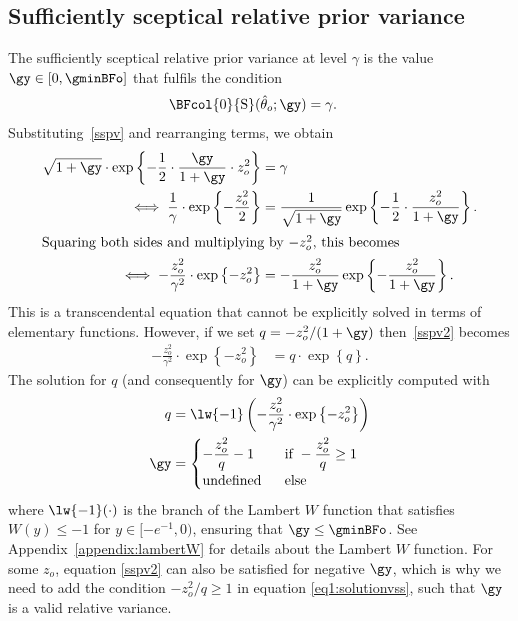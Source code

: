 \begin{subappendices}
  \renewcommand{\thesection}{\Alph{section}}

\section{Sufficiently sceptical relative prior variance}
\label{appendix:ssrv}
The sufficiently sceptical relative prior variance at level $\gamma$ is the
value $\gy \in [0, \gminBFo]$ that fulfils the condition
\begin{align}
  \label{sspv}
  \BFcol{0}{\text{S}}(\hat{\theta}_o; \gy)
  &= \gamma.
\end{align}
Substituting~\eqref{sspv} and rearranging terms, we obtain
\begin{align}
  \label{sspv2}
  \sqrt{1 + \gy} \cdot
  \exp\left\{-\frac{1}{2} \cdot
  \frac{\gy}{1 + \gy} \cdot z^2_o\right\}
  &= \gamma \nonumber \\
  \iff \frac{1}{\gamma} \cdot \exp\left\{-\frac{z_o^2}{2}\right\}
  &= \frac{1}{\sqrt{1 + \gy}} \exp\left\{-\frac{1}{2} \cdot
  \frac{z_o^2}{1 + \gy}\right\}. \nonumber
  \\
  \intertext{Squaring both sides and multiplying by $-z_o^2$, this becomes}
  \iff -\frac{z_o^2}{\gamma^2} \cdot \exp\left\{-z_o^2\right\}
  &= -\frac{z_o^2}{1 + \gy}
  \exp\left\{-\frac{z_o^2}{1 + \gy}\right\}.
\end{align}
This is a transcendental equation that cannot be explicitly solved in terms of
elementary functions. However, if we set $q = -z_o^2/(1 + \gy)$
then~\eqref{sspv2} becomes
\begin{align*}
  -\frac{z_o^2}{\gamma^2} \cdot \exp\left\{-z_o^2\right\}
  &= q \cdot \exp\left\{q\right\}.
\end{align*}
The solution for $q$ (and consequently for $\gy$) can be explicitly computed
with
\begin{align}
\label{eq1:solutionvss}
  q &= \lw{-1}\left(-\frac{z_o^2}{\gamma^2} \cdot \exp\left\{-z_o^2\right\}\right)
  \nonumber \\
  \gy &=
  \begin{cases}
    -\dfrac{z_o^2}{q} - 1 & ~~ \text{if} ~ -\dfrac{z_o^2}{q} \geq 1 \\
    \text{undefined} & ~~ \text{else}
  \end{cases}
\end{align}
where $\lw{-1}(\cdot)$ is the branch of the Lambert $W$ function that satisfies
$W(y) \leq -1$ for $y \in [-e^{-1}, 0)$, ensuring that $\gy \leq \gminBFo$. See
Appendix~\ref{appendix:lambertW} for details about the Lambert $W$ function. For
some $z_o$, equation \eqref{sspv2} can also be satisfied for negative $\gy$,
which is why we need to add the condition $-z_o^2/q \geq 1$ in equation
\eqref{eq1:solutionvss}, such that $\gy$ is a valid relative variance.


\end{subappendices}
